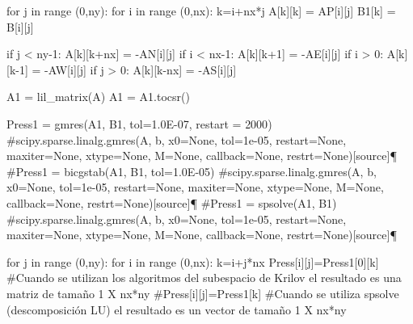 \documentclass[
  letterpaper,
  DIV=11,
  numbers=noendperiod]{scrreprt}
\newenvironment{Shaded}{\begin{snugshade}}{\end{snugshade}}
\newcommand{\BuiltInTok}[1]{\textcolor[rgb]{0.00,0.23,0.31}{#1}}
\newcommand{\CommentTok}[1]{\textcolor[rgb]{0.37,0.37,0.37}{#1}}
\newcommand{\ControlFlowTok}[1]{\textcolor[rgb]{0.00,0.23,0.31}{#1}}
\newcommand{\DecValTok}[1]{\textcolor[rgb]{0.68,0.00,0.00}{#1}}
\newcommand{\FloatTok}[1]{\textcolor[rgb]{0.68,0.00,0.00}{#1}}
\newcommand{\KeywordTok}[1]{\textcolor[rgb]{0.00,0.23,0.31}{#1}}
\newcommand{\NormalTok}[1]{\textcolor[rgb]{0.00,0.23,0.31}{#1}}
\newcommand{\OperatorTok}[1]{\textcolor[rgb]{0.37,0.37,0.37}{#1}}
\begin{document}
\begin{Shaded}
\begin{Highlighting}[]
    \ControlFlowTok{for}\NormalTok{ j }\KeywordTok{in} \BuiltInTok{range}\NormalTok{ (}\DecValTok{0}\NormalTok{,ny):}
        \ControlFlowTok{for}\NormalTok{ i }\KeywordTok{in} \BuiltInTok{range}\NormalTok{ (}\DecValTok{0}\NormalTok{,nx):}
\NormalTok{            k}\OperatorTok{=}\NormalTok{i}\OperatorTok{+}\NormalTok{nx}\OperatorTok{*}\NormalTok{j     }
\NormalTok{            A[k][k] }\OperatorTok{=}\NormalTok{ AP[i][j]}
\NormalTok{            B1[k] }\OperatorTok{=}\NormalTok{ B[i][j]}
        
            \ControlFlowTok{if}\NormalTok{ j }\OperatorTok{\textless{}}\NormalTok{ ny}\OperatorTok{{-}}\DecValTok{1}\NormalTok{: A[k][k}\OperatorTok{+}\NormalTok{nx] }\OperatorTok{=} \OperatorTok{{-}}\NormalTok{AN[i][j]}
            \ControlFlowTok{if}\NormalTok{ i }\OperatorTok{\textless{}}\NormalTok{ nx}\OperatorTok{{-}}\DecValTok{1}\NormalTok{: A[k][k}\OperatorTok{+}\DecValTok{1}\NormalTok{] }\OperatorTok{=} \OperatorTok{{-}}\NormalTok{AE[i][j]}
            \ControlFlowTok{if}\NormalTok{ i }\OperatorTok{\textgreater{}} \DecValTok{0}\NormalTok{: A[k][k}\OperatorTok{{-}}\DecValTok{1}\NormalTok{] }\OperatorTok{=} \OperatorTok{{-}}\NormalTok{AW[i][j]}
            \ControlFlowTok{if}\NormalTok{ j }\OperatorTok{\textgreater{}} \DecValTok{0}\NormalTok{: A[k][k}\OperatorTok{{-}}\NormalTok{nx] }\OperatorTok{=} \OperatorTok{{-}}\NormalTok{AS[i][j]    }
                
\NormalTok{    A1 }\OperatorTok{=}\NormalTok{ lil\_matrix(A)}
\NormalTok{    A1 }\OperatorTok{=}\NormalTok{ A1.tocsr()}
    
    
\NormalTok{    Press1 }\OperatorTok{=}\NormalTok{ gmres(A1, B1, tol}\OperatorTok{=}\FloatTok{1.0E{-}07}\NormalTok{, restart }\OperatorTok{=} \DecValTok{2000}\NormalTok{)  }\CommentTok{\#scipy.sparse.linalg.gmres(A, b, x0=None, tol=1e{-}05, restart=None, maxiter=None, xtype=None, M=None, callback=None, restrt=None)[source]¶}
    \CommentTok{\#Press1 = bicgstab(A1, B1, tol=1.0E{-}05)  \#scipy.sparse.linalg.gmres(A, b, x0=None, tol=1e{-}05, restart=None, maxiter=None, xtype=None, M=None, callback=None, restrt=None)[source]¶}
    \CommentTok{\#Press1 = spsolve(A1, B1)  \#scipy.sparse.linalg.gmres(A, b, x0=None, tol=1e{-}05, restart=None, maxiter=None, xtype=None, M=None, callback=None, restrt=None)[source]¶}

    \ControlFlowTok{for}\NormalTok{ j }\KeywordTok{in} \BuiltInTok{range}\NormalTok{ (}\DecValTok{0}\NormalTok{,ny):}
        \ControlFlowTok{for}\NormalTok{ i }\KeywordTok{in} \BuiltInTok{range}\NormalTok{ (}\DecValTok{0}\NormalTok{,nx):}
\NormalTok{            k}\OperatorTok{=}\NormalTok{i}\OperatorTok{+}\NormalTok{j}\OperatorTok{*}\NormalTok{nx}
\NormalTok{            Press[i][j]}\OperatorTok{=}\NormalTok{Press1[}\DecValTok{0}\NormalTok{][k]    }\CommentTok{\#Cuando se utilizan los algoritmos del subespacio de Krilov el resultado es una matriz de tamaño 1 X nx*ny}
            \CommentTok{\#Press[i][j]=Press1[k]    \#Cuando se utiliza spsolve (descomposición LU) el resultado es un vector de tamaño 1 X nx*ny}


\end{Highlighting}
\end{Shaded}
\end{document}
